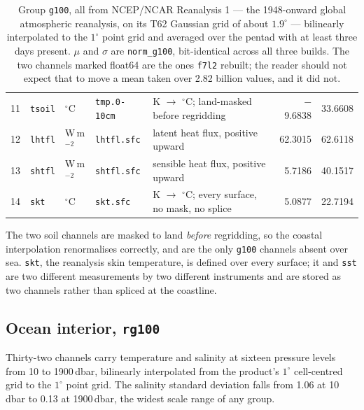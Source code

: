 \documentclass[10pt]{article}
\newcommand{\code}[1]{\texttt{#1}}
\begin{document}
\begin{table}[h]
\begin{tabular}{@{}rl>{\raggedright\arraybackslash}p{2.1cm}>{\raggedright\arraybackslash}p{2.1cm}>{\raggedright\arraybackslash}p{4.6cm}rr@{}}
11 & \code{tsoil} & $^\circ$C & \code{tmp.0-10cm} & K $\to$ $^\circ$C; land-masked before regridding & $-$9.6838 & 33.6608 \\
12 & \code{lhtfl} & W\,m$^{-2}$ & \code{lhtfl.sfc} & latent heat flux, positive upward & 62.3015 & 62.6118 \\
13 & \code{shtfl} & W\,m$^{-2}$ & \code{shtfl.sfc} & sensible heat flux, positive upward & 5.7186 & 40.1517 \\
14 & \code{skt} & $^\circ$C & \code{skt.sfc} & K $\to$ $^\circ$C; every surface, no mask, no splice & 5.0877 & 22.7194 \\
\bottomrule
\end{tabular}
\caption{Group \code{g100}, all from NCEP/NCAR Reanalysis 1 \cite{ncep} ---
the 1948-onward global atmospheric reanalysis, on its T62 Gaussian grid of
about $1.9^\circ$ --- bilinearly interpolated to the $1^\circ$ point grid and
averaged over the pentad with at least three days present. $\mu$ and $\sigma$
are \code{norm\_g100}, bit-identical across all three builds. The two channels
marked float64 are the ones \code{f7l2} rebuilt; the reader should not expect
that to move a mean taken over 2.82 billion values, and it did not.}
\end{table}

The two soil channels are masked to land \emph{before} regridding, so the
coastal interpolation renormalises correctly, and are the only \code{g100}
channels absent over sea. \code{skt}, the reanalysis skin temperature, is
defined over every surface; it and \code{sst} are two different measurements
by two different instruments and are stored as two channels rather than
spliced at the coastline.

\subsection{Ocean interior, \code{rg100}}

Thirty-two channels carry temperature and salinity at sixteen pressure levels
from 10 to 1900\,dbar, bilinearly interpolated from the product's $1^\circ$
cell-centred grid to the $1^\circ$ point grid. The salinity standard deviation
falls from 1.06 at 10\,dbar to 0.13 at 1900\,dbar, the widest scale range of
any group.
\end{document}
